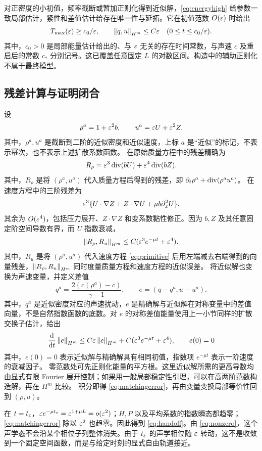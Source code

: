 对正密度的小初值，频率截断或暂加正则化得到近似解，\eqref{eq:energyhigh} 给参数一致局部估计，紧性和差值估计给存在唯一性与延拓。它在初值范数 $O(\varepsilon)$ 时给出
\[
 T_{\max}(\varepsilon)\ge c_0/\varepsilon,\qquad
 \left\|q,u\right\|_{H^m}\le C\varepsilon\quad(0\le t\le c_0/\varepsilon).
\]
其中，$c_0>0$ 是局部能量估计给出的、与 $\varepsilon$ 无关的存在时间常数，与声速 $c$ 及重启后的常数 $c_*$ 分别记号。这已覆盖任意固定 $L$ 的对数区间。构造中的辅助正则化不属于最终模型。

\subsection{残差计算与证明闭合}
设
\[
 \rho^a=1+\varepsilon^2b,\qquad u^a=\varepsilon U+\varepsilon^2Z.
\]
其中，$\rho^a,u^a$ 是截断到二阶的近似密度和近似速度，上标 $a$ 是“近似”的标记，不表示幂次，也不表示上述扩散系数函数。
在原始质量方程中的残差精确为
\[
 R_\rho=\varepsilon^3\operatorname{div}(bU)+\varepsilon^4\operatorname{div}(bZ).
\]
其中，$R_\rho$ 是将 $(\rho^a,u^a)$ 代入质量方程后得到的残差，即 $\partial_t\rho^a+\operatorname{div}(\rho^au^a)$。
在速度方程中的三阶残差为
\[
 \varepsilon^3\{U\cdot\nabla Z+Z\cdot\nabla U+\mu b\partial_x^2U\}.
\]
其余为 $O(\varepsilon^4)$，包括压力展开、$Z\cdot\nabla Z$ 和变系数黏性修正。因为 $b,Z$ 及其任意固定阶空间导数有界，而 $U$ 指数衰减，
\begin{equation}\label{eq:residual}
 \left\|R_\rho,R_u\right\|_{H^m}\le C(\varepsilon^3e^{-\mu t}+\varepsilon^4).
\end{equation}
其中，$R_u$ 是将 $(\rho^a,u^a)$ 代入速度方程 \eqref{eq:primitive} 后用左端减去右端得到的向量残差，$\left\|R_\rho,R_u\right\|_{H^m}$ 同时度量质量方程和速度方程的近似误差。
将近似解也变换为声速变量，并定义差值
\[
 q^a=\frac{2(c(\rho^a)-c)}{\gamma-1},\qquad
 e=(q-q^a,u-u^a).
\]
其中，$q^a$ 是近似密度对应的声速扰动，$e$ 是精确解与近似解在对称变量中的差值向量，不是自然指数函数的底数。对 $e$ 的对称差值能量使用上一小节同样的扩散交换子估计，给出
\[
 \frac{\mathrm d}{\mathrm dt}\left\|e\right\|_{H^m}
 \le C\varepsilon\left\|e\right\|_{H^m}+C(\varepsilon^3e^{-\mu t}+\varepsilon^4),\qquad e(0)=0
\]
其中，$e(0)=0$ 表示近似解与精确解具有相同初值，指数项 $e^{-\mu t}$ 表示一阶速度的衰减因子。
零范数处可先正则化能量的平方根。这里近似解所需的更高导数均由显式有限 Fourier 展开控制；如果用一般局部稳定性引理，可以在高两阶范数构造解，再在 $H^m$ 比较。
积分即得 \eqref{eq:matchingerror}，再由变量变换局部等价性回到 $(\rho,u)$。

在 $t=t_\varepsilon$，$\varepsilon e^{-\mu t_\varepsilon}=\varepsilon^{1+\mu L}=o(\varepsilon^2)$；$H,P$ 以及平均系数的指数瞬态都趋零；\eqref{eq:matchingerror} 除以 $\varepsilon^2$ 也趋零。因此得到 \eqref{eq:handoff}。由 \eqref{eq:nonzero}，这个声学态不会沿某个相位子列整体消失。由于 $t_\varepsilon$ 的声学相位随 $\varepsilon$ 转动，这不是收敛到一个固定空间函数，而是与给定时刻的显式自由轨道接近。


